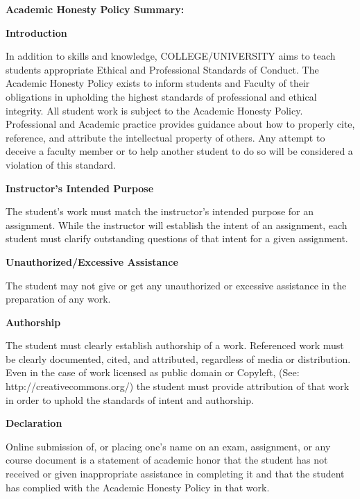 \documentclass[11pt]{article}
\begin{document}
\textbf {\large Academic Honesty Policy Summary:}

\textbf{Introduction}

\hspace{3mm}
\hangindent=5mm In addition to skills and knowledge, COLLEGE/UNIVERSITY aims to teach students appropriate Ethical and Professional Standards of Conduct. The Academic Honesty Policy exists to inform students and Faculty of their obligations in upholding the highest standards of professional and ethical integrity. All student work is subject to the Academic Honesty Policy. Professional and Academic practice provides guidance about how to properly cite, reference, and attribute the intellectual property of others. Any attempt to deceive a faculty member or to help another student to do so will be considered a violation of this standard.

\textbf{Instructor's Intended Purpose}

\hspace{3mm}
\hangindent=5mm The student's work must match the instructor's intended purpose for an assignment. While the instructor will establish the intent of an assignment, each student must clarify outstanding questions of that intent for a given assignment.

\textbf{Unauthorized/Excessive Assistance}

\hspace{3mm}
\hangindent=5mm The student may not give or get any unauthorized or excessive assistance in the preparation of any work.

\textbf{Authorship}

\hspace{3mm}
\hangindent=5mm The student must clearly establish authorship of a work. Referenced work must be clearly documented, cited, and attributed, regardless of media or distribution. Even in the case of work licensed as public domain or Copyleft, (See: http://creativecommons.org/) the student must provide attribution of that work in order to uphold the standards of intent and authorship.

\textbf{Declaration}

\hspace{3mm}
\hangindent=5mm Online submission of, or placing one's name on an exam, assignment, or any course document is a statement of academic honor that the student has not received or given inappropriate assistance in completing it and that the student has complied with the Academic Honesty Policy in that work.
\end{document}
